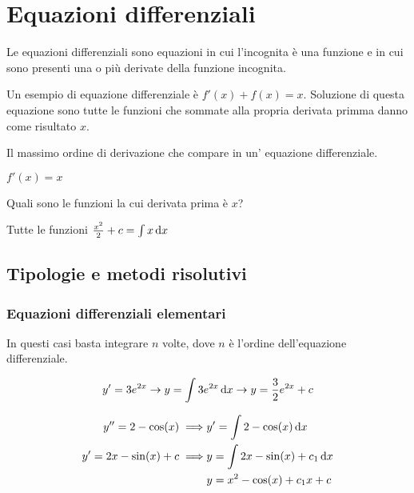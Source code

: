 \chapter{Equazioni differenziali}

Le equazioni differenziali sono equazioni in cui l'incognita è una funzione e in cui sono presenti una o più derivate della funzione incognita.

Un esempio di equazione differenziale è $f'(x) + f(x) = x$. Soluzione di questa equazione sono tutte le funzioni che sommate alla propria derivata primma danno come risultato $x$.

\begin{definition}
Il massimo ordine di derivazione che compare in un' equazione differenziale.
\end{definition}

\begin{example}
$f'(x) = x$

Quali sono le funzioni la cui derivata prima è $x$?

Tutte le funzioni $\frac{x^2}{2} + c = \int x \mathop{}\!\mathrm{d} x$
\end{example}

\section{Tipologie e metodi risolutivi}

\subsection{Equazioni differenziali elementari}

In questi casi basta integrare $n$ volte, dove $n$ è l'ordine dell'equazione differenziale.

\begin{example}
$$
y' = 3e^{2x} \to
y = \int 3e^{2x} \mathop{}\!\mathrm{d} x \to
y = \frac{3}{2} e^{2x} + c
$$
\end{example}

\begin{example}
\begin{align*}
y'' = 2-\cos(x) \implies & y' = \int 2-\cos(x) \mathop{}\!\mathrm{d} x \\
y' = 2x-\sin(x) + c \implies & y = \int 2x-\sin(x) + c_1 \mathop{}\!\mathrm{d} x \\
& y = x^2-\cos(x) + c_1x + c
\end{align*}
\end{example}

